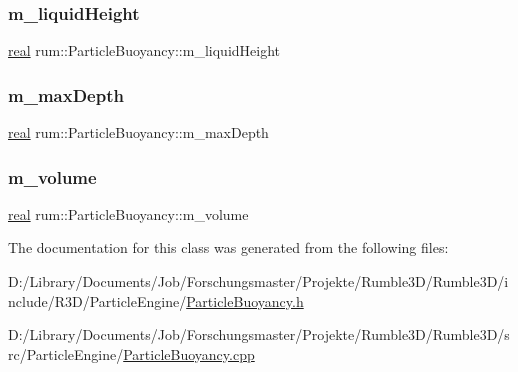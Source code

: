 \mbox{\label{classrum_1_1_particle_buoyancy_a220309bad493fc0d090bd3e91d9f4acb}} 
\subsubsection{\texorpdfstring{m\+\_\+liquid\+Height}{m\_liquidHeight}}
{\footnotesize\ttfamily \mbox{\hyperlink{namespacerum_a7e8cca23573d5eaead0f138cbaa4862c}{real}} rum\+::\+Particle\+Buoyancy\+::m\+\_\+liquid\+Height\hspace{0.3cm}{\ttfamily [protected]}}

\mbox{\label{classrum_1_1_particle_buoyancy_af29f25245a785fc1bceafeac08728370}} 
\subsubsection{\texorpdfstring{m\+\_\+max\+Depth}{m\_maxDepth}}
{\footnotesize\ttfamily \mbox{\hyperlink{namespacerum_a7e8cca23573d5eaead0f138cbaa4862c}{real}} rum\+::\+Particle\+Buoyancy\+::m\+\_\+max\+Depth\hspace{0.3cm}{\ttfamily [protected]}}

\mbox{\label{classrum_1_1_particle_buoyancy_acb0a75c58de8ddede0b4be9939917c32}} 
\subsubsection{\texorpdfstring{m\+\_\+volume}{m\_volume}}
{\footnotesize\ttfamily \mbox{\hyperlink{namespacerum_a7e8cca23573d5eaead0f138cbaa4862c}{real}} rum\+::\+Particle\+Buoyancy\+::m\+\_\+volume\hspace{0.3cm}{\ttfamily [protected]}}



The documentation for this class was generated from the following files\+:\begin{DoxyCompactItemize}
\item 
D\+:/\+Library/\+Documents/\+Job/\+Forschungsmaster/\+Projekte/\+Rumble3\+D/\+Rumble3\+D/include/\+R3\+D/\+Particle\+Engine/\mbox{\hyperlink{_particle_buoyancy_8h}{Particle\+Buoyancy.\+h}}\item 
D\+:/\+Library/\+Documents/\+Job/\+Forschungsmaster/\+Projekte/\+Rumble3\+D/\+Rumble3\+D/src/\+Particle\+Engine/\mbox{\hyperlink{_particle_buoyancy_8cpp}{Particle\+Buoyancy.\+cpp}}\end{DoxyCompactItemize}
